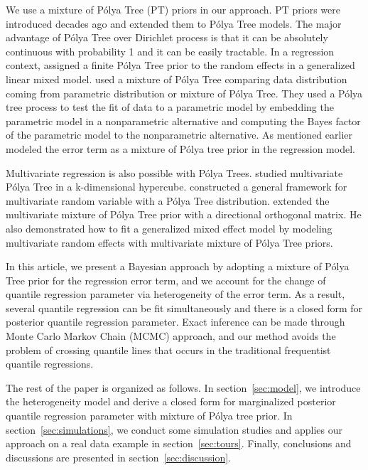 \documentclass[12pt]{article}
\newcommand{\polya}{P\'{o}lya}
\begin{document}
We use a mixture of \polya{} Tree (PT) priors in our approach. PT
priors were introduced decades ago \citep{freedman1963, fabius1964,
  ferguson1974} and \citet{lavine1992, lavine1994} extended them to
\polya{} Tree models. The major advantage of \polya{} Tree over
Dirichlet process is that it can be absolutely continuous with
probability 1 and it can be easily tractable. In a regression context,
\citet{walker1997, walker1999} assigned a finite \polya{} Tree prior
to the random effects in a generalized linear mixed
model. \citet{berger2001} used a mixture of \polya{} Tree comparing
data distribution coming from parametric distribution or mixture of
\polya{} Tree. They used a \polya{} tree process to test the fit of
data to a parametric model by embedding the parametric model in a
nonparametric alternative and computing the Bayes factor of the
parametric model to the nonparametric alternative.  As mentioned
earlier \citet{hanson2002} modeled the error term as a mixture of
\polya{} tree prior in the regression model.

Multivariate regression is also possible with \polya{}
Trees. \citet{paddock1999, paddock2002} studied multivariate \polya{}
Tree in a k-dimensional hypercube. \citet{hanson2006} constructed a
general framework for multivariate random variable with a \polya{}
Tree distribution. \citet{jara2009} extended the multivariate mixture
of \polya{} Tree prior with a directional orthogonal matrix.  He also
demonstrated how to fit a generalized mixed effect model by modeling
multivariate random effects with multivariate mixture of \polya{} Tree
priors.

In this article, we present a Bayesian approach by adopting a mixture
of \polya{} Tree prior for the regression error term, and we account
for the change of quantile regression parameter via heterogeneity of
the error term. As a result, several quantile regression can be fit
simultaneously and there is a closed form for posterior quantile
regression parameter. Exact inference can be made through Monte Carlo
Markov Chain (MCMC) approach, and our method avoids the problem of
crossing quantile lines that occurs in the traditional frequentist
quantile regressions.

The rest of the paper is organized as follows. In
section~\ref{sec:model}, we introduce the heterogeneity model and
derive a closed form for marginalized posterior quantile regression
parameter with mixture of \polya{} tree prior.  In
section~\ref{sec:simulations}, we conduct some simulation studies and
applies our approach on a real data example in
section~\ref{sec:tours}. Finally, conclusions and discussions are
presented in section~\ref{sec:discussion}.
\end{document}
